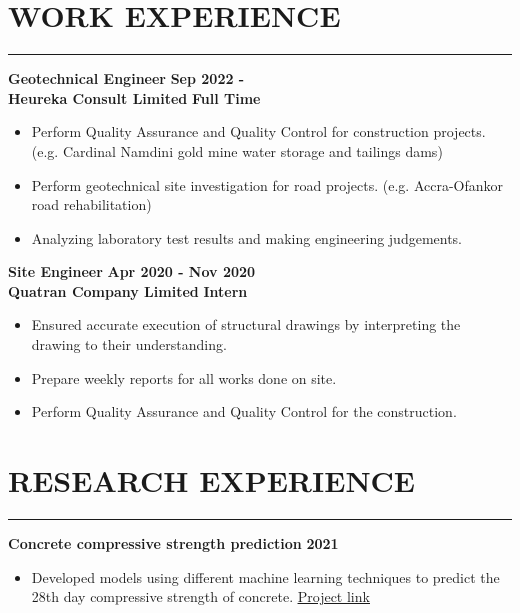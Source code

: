 \documentclass[letterpaper, 12pt]{article}
\newcommand{\cvsection}[1]{
	
	\section*{#1}	
	\rule[20pt]{\linewidth}{0.5pt} %

}
\newcommand{\verticalSpace}{4pt}
\newcommand{\itemizeMargin}{11pt}
\begin{document}
	
	\cvsection{WORK EXPERIENCE}
	
	\textbf{Geotechnical Engineer} \hfill \textbf{Sep 2022 - } \\ [\verticalSpace]
	\textbf{Heureka Consult Limited} \hfill \textbf{Full Time}
	
	\begin{itemize}[leftmargin=\itemizeMargin]
		
		\item Perform Quality Assurance and Quality Control for construction projects. (e.g. Cardinal Namdini gold mine water storage and tailings dams)
		\item Perform geotechnical site investigation for road projects. (e.g. Accra-Ofankor road rehabilitation)
		\item Analyzing laboratory test results and making engineering judgements.
		
	\end{itemize} 
	
	\textbf{Site Engineer} \hfill \textbf{Apr 2020 - Nov 2020} \\ [\verticalSpace]
	\textbf{Quatran Company Limited} \hfill \textbf{Intern}
	
	\begin{itemize}[leftmargin=\itemizeMargin]
		
		\item Ensured accurate execution of structural drawings by interpreting the drawing to their understanding.
		\item Prepare weekly reports for all works done on site.
		\item Perform Quality Assurance and Quality Control for the construction.

	\end{itemize}
	
	
	\cvsection{RESEARCH EXPERIENCE}
	
	\textbf{Concrete compressive strength prediction} \hfill \textbf{2021}
	\begin{itemize}[leftmargin=\itemizeMargin]
		\item Developed models using different machine learning techniques to predict the 28th day compressive strength of concrete. \href{https://www.github.com/patrickboateng/strength-prediction}{\underline{Project link}}
	\end{itemize}
	
	
\end{document}
